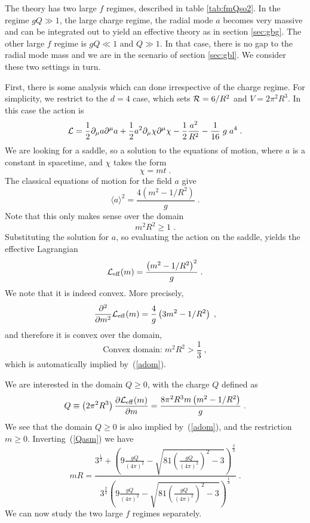 \documentclass[11pt]{article}
\numberwithin{equation}{section}
\newcommand{\be}{\begin{equation}} \newcommand{\ee}{\end{equation}}
\begin{document}
The theory has two large $f$ regimes, described in table \ref{tab:fmQso2}. In the regime $g Q \gg 1$, the large charge regime, the radial mode $a$ becomes very massive and can be integrated out to yield an effective theory as in section \ref{sec:gbg}. The other large $f$ regime is $g Q \ll 1$ and $Q \gg 1$. In that case, there is no gap to the radial mode mass and we are in the scenario of section \ref{sec:gbl}. We consider these two settings in turn. 

First, there is some analysis which can done irrespective of the charge regime.
For simplicity, we restrict to the $d=4$ case, which sets ${\cal R}=6/R^2$ and $V = 2 \pi^2 R^3$. In this case the action is
\be
 {\cal L} = \frac{1}{2} \partial_{\mu} a \partial^{\mu} a + \frac{1}{2} a^2 \partial_{\mu} \chi \partial^{\mu} \chi - \frac12 \frac{a^2}{R^2} - \frac{1}{16} \;g\; a^{4} \;.
     \label{simmdac4d}
\ee
We are looking for a saddle, so a solution to the equations of motion, where $a$ is a constant in spacetime, and $\chi$ takes the form
\be
\chi = m t \;.
\label{backmt}
\ee
The classical equations of motion for the field $a$ give
  \be
  \langle a \rangle^2 = \frac{4\left(m^2 - 1/R^2\right)}{g} \;.
  \label{perta}
  \ee
  Note that this only makes sense over the domain
  \be
  m^2 R^2 \geq 1 \;.
  \label{adom}
  \ee
 Substituting the solution for $a$, so evaluating the action on the saddle, yields the effective Lagrangian
 \be
 {\cal L}_{\mathrm{eff}}(m) = \frac{\left(m^2 - 1/R^2\right)^2}{g} \;.
 \ee
 We note that it is indeed convex. More precisely, 
 \be
 \frac{\partial^2}{\partial m^2} {\cal L}_{\mathrm{eff}}(m) = \frac{4}{g} \left(3m^2 - 1/R^2\right)\;,
 \label{pard2ml}
 \ee
 and therefore it is convex over the domain, 
 \be
 \text{Convex domain:}\;m^2 R^2 > \frac{1}{3} \;,
 \label{convexdom}
 \ee
 which is automatically implied by~(\ref{adom}).
 
 We are interested in the domain $Q \geq 0$, with the charge $Q$ defined as
 \be
 Q \equiv \left(2 \pi^2 R^3 \right) \frac{\partial {\cal L}_{\mathrm{eff}}(m)}{\partial m} = \frac{ 8\pi^2 R^3  m \left(m^2-1/R^2\right)}{g} \;.
 \label{Qasm}
 \ee
 We see that the domain $Q\geq 0$ is also implied by~(\ref{adom}), and the restriction $m\geq 0$. 
Inverting~(\ref{Qasm}) we have
 \be
 m R = \frac{3^{\frac13}+\left(9 \frac{g Q}{\left(4\pi\right)^2} - \sqrt{81 \left(\frac{g Q}{\left(4\pi\right)^2}\right)^2 -3}\right)^{\frac23}}{3^{\frac23}\left(9 \frac{g Q}{\left(4\pi\right)^2} - \sqrt{81 \left(\frac{g Q}{\left(4\pi\right)^2}\right)^2 -3}\right)^{\frac13}} \;.
 \label{fullm}
 \ee
We can now study the two large $f$ regimes separately.
\end{document}
